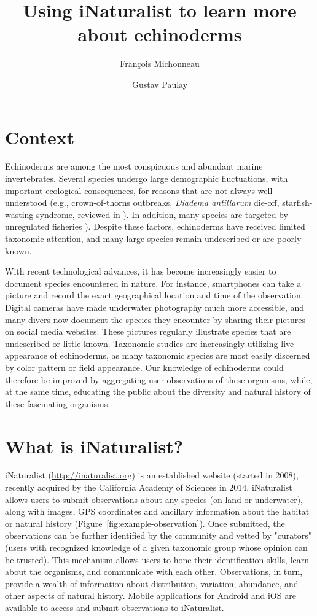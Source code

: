 \documentclass[11pt]{article}\usepackage[]{graphicx}\usepackage[]{color}
\title{Using iNaturalist to learn more about echinoderms}
\author{Fran\c{c}ois Michonneau}
\author{Gustav Paulay}
\affil{Florida Museum of Natural History, University of Florida, Gainesville,
  FL 32611-7800, USA; emails: francois.michonneau@gmail.com, paulay@flmnh.ufl.edu}
\date{}
\begin{document}
\maketitle


\section*{Context}

Echinoderms are among the most conspicuous and abundant marine
invertebrates. Several species undergo large demographic fluctuations, with
important ecological consequences, for reasons that are not always well
understood (e.g., crown-of-thorns outbreaks, \textit{Diadema antillarum}
die-off, starfish-wasting-syndrome, reviewed in \citealt{Uthicke2009}). In
addition, many species are targeted by unregulated fisheries
\citep[e.g.][]{Purcell2014}). Despite these factors, echinoderms have received
limited taxonomic attention, and many large species remain undescribed or are
poorly known.

With recent technological advances, it has become increasingly easier to
document species encountered in nature. For instance, smartphones can take a
picture and record the exact geographical location and time of the
observation. Digital cameras have made underwater photography much more
accessible, and many divers now document the species they encounter by sharing
their pictures on social media websites. These pictures regularly illustrate
species that are undescribed or little-known. Taxonomic studies are increasingly
utilizing live appearance of echinoderms, as many taxonomic species are most
easily discerned by color pattern or field appearance. Our knowledge of
echinoderms could therefore be improved by aggregating user observations of
these organisms, while, at the same time, educating the public about the
diversity and natural history of these fascinating organisms.

\section*{What is iNaturalist?}

iNaturalist (\href{http://inaturalist.org}{http://inaturalist.org}) is an
established website (started in 2008), recently acquired by the California
Academy of Sciences in 2014. iNaturalist allows users to submit observations
about any species (on land or underwater), along with images, GPS coordinates
and ancillary information about the habitat or natural history
(Figure~\ref{fig:example-observation}). Once submitted, the observations can be
further identified by the community and vetted by "curators" (users with
recognized knowledge of a given taxonomic group whose opinion can be
trusted). This mechanism allows users to hone their identification skills, learn
about the organisms, and communicate with each other. Observations, in turn,
provide a wealth of information about distribution, variation, abundance, and
other aspects of natural history. Mobile applications for Android and iOS are
available to access and submit observations to iNaturalist.
\end{document}
